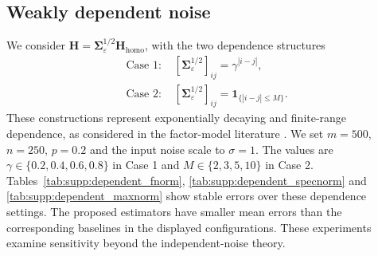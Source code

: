 \documentclass[numsec,webpdf,modern,large,namedate]{oup-authoring-template}
\theoremstyle{plain}
\theoremstyle{remark}
\newcommand{\bH}{\bm{H}}
\begin{document}
\subsection{Weakly dependent noise}
We consider $\bH=\bm\Sigma_\varepsilon^{1/2}\bH_{\mathrm{homo}}$, with the two dependence structures
\begin{align*}
 \text{Case 1: }&[\bm\Sigma_\varepsilon^{1/2}]_{ij}=\gamma^{|i-j|},\\
 \text{Case 2: }&[\bm\Sigma_\varepsilon^{1/2}]_{ij}=\mathbf1_{\{|i-j|\le M\}}.
\end{align*}
These constructions represent exponentially decaying and finite-range dependence, as considered in the factor-model literature \citep{fan2024can,choi2025inference}. We set $m=500$, $n=250$, $p=0.2$ and the input noise scale to $\sigma=1$. The values are $\gamma\in\{0.2,0.4,0.6,0.8\}$ in Case 1 and $M\in\{2,3,5,10\}$ in Case 2.
Tables~\ref{tab:supp:dependent_fnorm}, \ref{tab:supp:dependent_specnorm} and \ref{tab:supp:dependent_maxnorm} show stable errors over these dependence settings. The proposed estimators have smaller mean errors than the corresponding baselines in the displayed configurations. These experiments examine sensitivity beyond the independent-noise theory.
\end{document}
